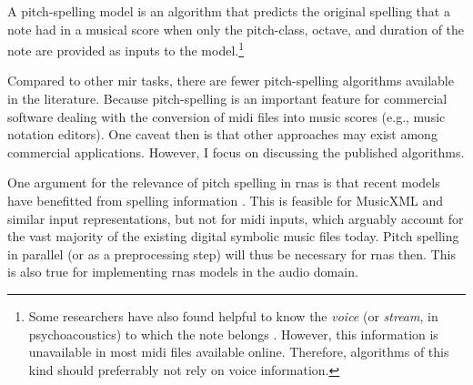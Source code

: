 

A pitch-spelling model is an algorithm that predicts the
original spelling that a note had in a musical score when
only the pitch-class, octave, and duration of the note are
provided as inputs to the model.\footnote{Some researchers
have also found helpful to know the \emph{voice} (or
\emph{stream}, in psychoacoustics) to which the note belongs
\parencite{teodoru2007pitch}. However, this information is
unavailable in most \gls{midi} files available online.
Therefore, algorithms of this kind should preferrably not
rely on voice information.}


Compared to other \gls{mir} tasks, there are fewer
pitch-spelling algorithms available in the literature.
Because pitch-spelling is an important feature for
commercial software dealing with the conversion of
\gls{midi} files into music scores (e.g., music notation
editors). One caveat then is that other approaches may exist
among commercial applications. However, I focus on
discussing the published algorithms.

One argument for the relevance of pitch spelling in
\glspl{rna} is that recent models have benefitted from
spelling information \parencite{micchi2020not}. This is
feasible for MusicXML and similar input representations, but
not for \gls{midi} inputs, which arguably account for the
vast majority of the existing digital symbolic music files
today. Pitch spelling in parallel (or as a preprocessing
step) will thus be necessary for \glspl{rna} then. This is
also true for implementing \glspl{rna} models in the audio
domain.
